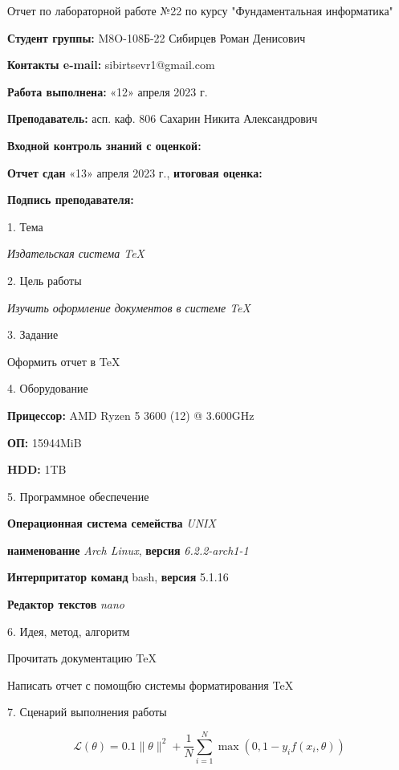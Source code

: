 \documentclass[12pt]{article}
\begin{document}
\Large Отчет по лабораторной работе №22 по курсу "Фундаментальная информатика"
\normalsize

{\bfseries Студент группы:} M8O-108Б-22 Сибирцев Роман Денисович

{\bfseries Контакты e-mail:} sibirtsevr1@gmail.com

{\bfseries Работа выполнена:} «12» апреля 2023 г. 

{\bfseries Преподаватель:} асп. каф. 806 Сахарин Никита Александрович

{\bfseries Входной контроль знаний с оценкой:}

{\bfseries Отчет сдан} «13» апреля 2023 г., {\bfseries итоговая оценка:}

{\bfseries Подпись преподавателя:} \underline{\hspace{3cm}}


{\Large 1. Тема}

{\itshape Издательская система \TeX}

{\Large 2. Цель работы}

{\itshape Изучить оформление документов в системе \TeX}

{\Large 3. Задание}

Оформить отчет в \TeX

{\Large 4. Оборудование}


{\bfseries Прицессор:} AMD Ryzen 5 3600 (12) @ 3.600GHz

{\bfseries ОП:} 15944MiB

{\bfseries HDD:} 1TB

{\Large 5. Программное обеспечение}


{\bfseries Операционная система семейства} {\itshape UNIX}

{\bfseries наименование} {\itshape Arch Linux}, {\bfseries версия} {\itshape 6.2.2-arch1-1} 

{\bfseries Интерпритатор команд} {bash}, {\bfseries версия} {5.1.16} 

{\bfseries Редактор текстов} {\itshape nano}

{\Large 6. Идея, метод, алгоритм}

Прочитать документацию \TeX

Написать отчет с помощбю системы форматирования \TeX


{\Large 7. Сценарий выполнения работы}

\begin{equation}
\mathcal{L}(\theta) = 0.1 \|\theta\|^2 + \frac{1}{N}\sum\limits_{i=1}^N \max(0, 1 - y_i f(x_i, \theta))
\end{equation}
\end{document}
